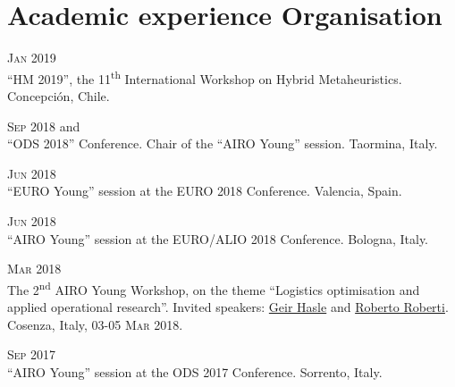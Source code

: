 \section*{Academic experience {\small Organisation}}

\begin{paracol}{2}
  \textsc{Jan 2019}
\switchcolumn
  \\
  ``HM 2019'', the 11\textsuperscript{th} International Workshop on Hybrid Metaheuristics.
  Concepción, Chile.
\end{paracol}

\begin{paracol}{2}
  \textsc{Sep 2018}
\switchcolumn
   and \\
  ``ODS 2018'' Conference. Chair of the ``AIRO Young'' session.
  Taormina, Italy.
\end{paracol}

\begin{paracol}{2}
  \textsc{Jun 2018}
\switchcolumn
  \\
  ``EURO Young'' session at the EURO 2018 Conference.
  Valencia, Spain.
\end{paracol}

\begin{paracol}{2}
  \textsc{Jun 2018}
\switchcolumn
  \\
  ``AIRO Young'' session at the EURO/ALIO 2018 Conference.
  Bologna, Italy.
\end{paracol}

\begin{paracol}{2}
  \textsc{Mar 2018}
\switchcolumn
  \\
  The 2\textsuperscript{nd} AIRO Young Workshop, on the theme ``Logistics optimisation and applied operational research''.
  Invited speakers: \href{https://scholar.google.it/citations?user=GXRnRZgAAAAJ&hl}{Geir Hasle} and \href{https://scholar.google.it/citations?user=pNQZmwIAAAAJ}{Roberto Roberti}.
  Cosenza, Italy, \textsc{03-05 Mar 2018}.
\end{paracol}

\begin{paracol}{2}
  \textsc{Sep 2017}
\switchcolumn
  \\
  ``AIRO Young'' session at the ODS 2017 Conference.
  Sorrento, Italy.
\end{paracol}

